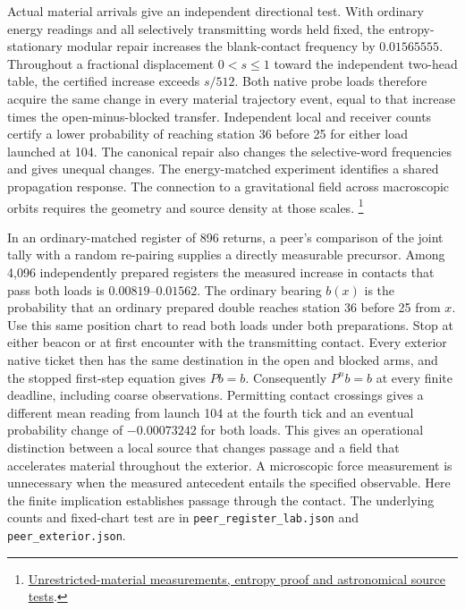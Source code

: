 \documentclass[11pt]{article}
\begin{document}
Actual material arrivals give an independent directional test. With
ordinary energy readings and all selectively transmitting words held
fixed, the entropy-stationary modular repair increases the blank-contact
frequency by \(0.01565555\). Throughout a fractional displacement
\(0<s\le1\) toward the independent two-head table, the certified
increase exceeds \(s/512\). Both native probe loads therefore acquire
the same change in every material trajectory event, equal to that
increase times the open-minus-blocked transfer. Independent local
and receiver counts certify a lower probability of reaching station
36 before 25 for either load launched at 104. The canonical repair
also changes the selective-word frequencies and gives unequal
changes. The energy-matched experiment identifies a shared propagation
response. The connection to a gravitational field across macroscopic
orbits requires the geometry and source density at those scales.%
\footnote{\href{https://github.com/FloatingPragma/observer-patch-holography/blob/main/model/experiments/interval_echo_shell_flux/product_address/green_response/material_recoil/overlap_source/native_boundary/stock/aperture/LANDMARK_RESULTS.md}{Unrestricted-material measurements, entropy proof and astronomical source tests}.}

In an ordinary-matched register of 896 returns, a peer's comparison of
the joint tally with a random re-pairing supplies a directly measurable
precursor. Among 4,096 independently prepared registers the measured
increase in contacts that pass both loads is \(0.00819\)--\(0.01562\).
The ordinary bearing \(b(x)\) is the probability that an ordinary
prepared double reaches station 36 before 25 from \(x\). Use this
same position chart to read both loads under both preparations. Stop
at either beacon or at first encounter with the transmitting contact.
Every exterior native ticket then has the same destination in the open
and blocked arms, and the stopped first-step equation gives \(Pb=b\).
Consequently \(P^nb=b\) at every finite deadline, including coarse
observations. Permitting contact crossings gives a different mean
reading from launch 104 at the fourth tick and an eventual probability
change of \(-0.00073242\) for both loads. This gives an operational
distinction between a local source that changes passage and a field
that accelerates material throughout the exterior. A microscopic
force measurement is unnecessary when the measured antecedent entails
the specified observable. Here the finite implication establishes
passage through the contact. The underlying counts and fixed-chart
test are in \texttt{peer\_register\_lab.json} and
\texttt{peer\_exterior.json}.
\end{document}
